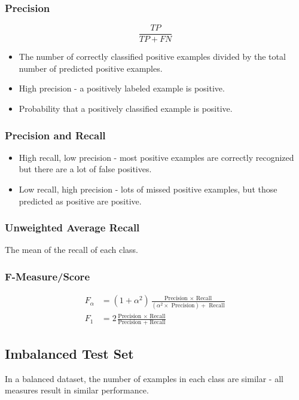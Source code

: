 \documentclass[11pt]{article}
\begin{document}
\subsubsection{Precision}
\[
  \frac{TP}{TP + FN} 
\]
\begin{itemize}
  \item The number of correctly classified positive examples divided by the total number of predicted positive examples.
  \item High precision - a positively labeled example is positive.
  \item Probability that a positively classified example is positive.
\end{itemize}

\subsubsection{Precision and Recall}
\begin{itemize}
  \item High recall, low precision - most positive examples are correctly recognized but there are a lot of false positives.
  \item Low recall, high precision - lots of missed positive examples, but those predicted as positive are positive.
\end{itemize}

\subsubsection{Unweighted Average Recall}
The mean of the recall of each class.

\subsubsection{F-Measure/Score}
\begin{align*}
  F_\alpha &= (1 + \alpha^2)\frac{\text{Precision } \times \text{ Recall}}{(\alpha^2 \times \text{ Precision}) + \text{ Recall}} \\
  F_1 &= 2\frac{\text{Precision } \times \text{ Recall}}{\text{Precision } + \text{ Recall}}
\end{align*}

\subsection{Imbalanced Test Set}
In a balanced dataset, the number of examples in each class are similar - all measures result in similar performance.
\end{document}
